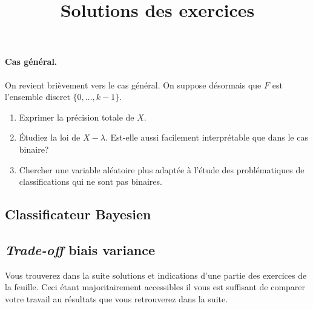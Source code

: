 \documentclass[11pt, a4paper]{article}
\begin{document}
\paragraph{Cas général.} On revient brièvement vers le cas général. On
suppose désormais que $F$ est l'ensemble discret $\{0, \ldots, k-1\}$.
\begin{question}
  \begin{enumerate}
  \item Exprimer la précision totale de $X$.
  \item Étudiez la loi de $X-\lambda$. Est-elle aussi facilement
    interprétable que dans le cas binaire?
  \item Chercher une variable aléatoire plus adaptée à l'étude des
    problématiques de classifications qui ne sont pas binaires.
  \end{enumerate}
\end{question}


\subsection{Classificateur Bayesien}
\label{sec:Bayesien}

\subsection{\emph{Trade-off} biais variance}
\label{sec:biaisVariance}


\pretitle{\vspace{-2\baselineskip} \begin{center}}
\title{%
  { \huge Solutions des exercices}%
}
\posttitle{
\end{center}
  \vspace{.5\baselineskip}
  \rule{\textwidth}{1.5pt}
  \vspace{-5\baselineskip}
}

\maketitle\thispagestyle{fancy}

\noindent Vous trouverez dans la suite solutions et indications d'une
partie des exercices de la feuille. Ceci étant majoritairement
accessibles il vous est suffisant de comparer votre travail au
résultats que vous retrouverez dans la suite.

\printsolutions
\end{document}
